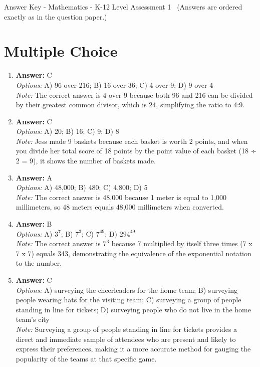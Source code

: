 \documentclass[12pt]{article}
\begin{document}
\begin{center}
Answer Key - Mathematics - K-12 Level Assessment 1 \
\small (Answers are ordered exactly as in the question paper.)
\end{center}

\section*{Multiple Choice}
\begin{enumerate}[label=\arabic*.]
\item \textbf{Answer:} C
\\ \textit{Options:} A) 96 over 216; B) 16 over 36; C) 4 over 9; D) 9 over 4
\\ \textit{Note:} The correct answer is 4 over 9 because both 96 and 216 can be divided by their greatest common divisor, which is 24, simplifying the ratio to 4:9.
\item \textbf{Answer:} C
\\ \textit{Options:} A) 20; B) 16; C) 9; D) 8
\\ \textit{Note:} Jess made 9 baskets because each basket is worth 2 points, and when you divide her total score of 18 points by the point value of each basket (18 ÷ 2 = 9), it shows the number of baskets made.
\item \textbf{Answer:} A
\\ \textit{Options:} A) 48,000; B) 480; C) 4,800; D) 5
\\ \textit{Note:} The correct answer is 48,000 because 1 meter is equal to 1,000 millimeters, so 48 meters equals 48,000 millimeters when converted.
\item \textbf{Answer:} B
\\ \textit{Options:} A) $3^7$; B) $7^3$; C) $7^49$; D) $294^49$
\\ \textit{Note:} The correct answer is $7^3$ because 7 multiplied by itself three times (7 x 7 x 7) equals 343, demonstrating the equivalence of the exponential notation to the number.
\item \textbf{Answer:} C
\\ \textit{Options:} A) surveying the cheerleaders for the home team; B) surveying people wearing hats for the visiting team; C) surveying a group of people standing in line for tickets; D) surveying people who do not live in the home team's city
\\ \textit{Note:} Surveying a group of people standing in line for tickets provides a direct and immediate sample of attendees who are present and likely to express their preferences, making it a more accurate method for gauging the popularity of the teams at that specific game.
\end{enumerate}
\end{document}
